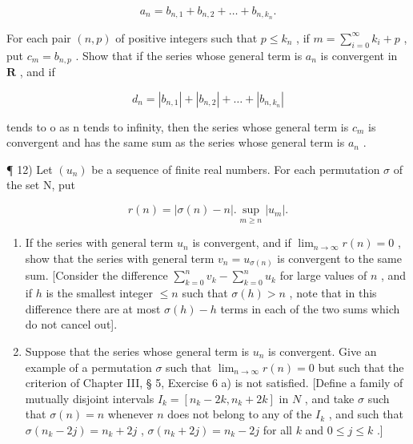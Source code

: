 \[
a _ {n} = b _ {n, 1} + b _ {n, 2} + \dots + b _ {n, k _ {n}}.
\]

For each pair \((n, p)\) of positive integers such that \(p \leqslant k_n\) , if \(m = \sum_{i=0}^{\infty} k_i + p\) , put \(c_m = b_{n,p}\) . Show that if the series whose general term is \(a_n\) is convergent in \(\mathbf{R}\) , and if

\[
d _ {n} = \left| b _ {n, 1} \right| + \left| b _ {n, 2} \right| + \dots + \left| b _ {n, k _ {n}} \right|
\]

tends to o as n tends to infinity, then the series whose general term is \(c_{m}\) is convergent and has the same sum as the series whose general term is \(a_{n}\) .

¶ 12) Let \((u_n)\) be a sequence of finite real numbers. For each permutation \(\sigma\) of the set N, put

\[
r (n) = | \sigma (n) - n |. \sup _ {m \geqslant n} | u _ {m} |.
\]

\begin{enumerate}
\def\labelenumi{\alph{enumi})}
\item
  If the series with general term \(u_n\) is convergent, and if \(\lim_{n \to \infty} r(n) = 0\) , show that the series with general term \(v_n = u_{\sigma(n)}\) is convergent to the same sum. {[}Consider the difference \(\sum_{k=0}^{n} v_k - \sum_{k=0}^{n} u_k\) for large values of \(n\) , and if \(h\) is the smallest integer \(\leqslant n\) such that \(\sigma(h) > n\) , note that in this difference there are at most \(\sigma(h) - h\) terms in each of the two sums which do not cancel out{]}.
\item
  Suppose that the series whose general term is \(u_n\) is convergent. Give an example of a permutation \(\sigma\) such that \(\lim_{n \to \infty} r(n) = 0\) but such that the criterion of Chapter III, § 5, Exercise 6 a) is not satisfied. {[}Define a family of mutually disjoint intervals \(I_k = [n_k - 2k, n_k + 2k]\) in \(N\) , and take \(\sigma\) such that \(\sigma(n) = n\) whenever \(n\) does not belong to any of the \(I_k\) , and such that \(\sigma(n_k - 2j) = n_k + 2j\) , \(\sigma(n_k + 2j) = n_k - 2j\) for all \(k\) and \(0 \leqslant j \leqslant k\) .{]}
\end{enumerate}

